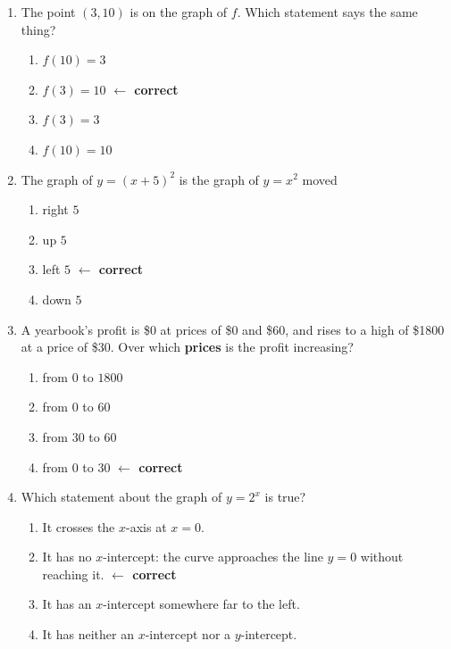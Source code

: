 \begin{enumerate}[leftmargin=1.8em, itemsep=6pt, topsep=5pt]
\small

\item The point $(3,10)$ is on the graph of $f$. Which statement says the same thing?
\begin{enumerate}[label=(\Alph*), leftmargin=2.2em, itemsep=1pt, topsep=2pt]
  \item $f(10)=3$
  \item $f(3)=10$ \quad \textcolor{keyred}{\textbf{$\leftarrow$ correct}}
  \item $f(3)=3$
  \item $f(10)=10$
\end{enumerate}

\item The graph of $y=(x+5)^2$ is the graph of $y=x^2$ moved
\begin{enumerate}[label=(\Alph*), leftmargin=2.2em, itemsep=1pt, topsep=2pt]
  \item right $5$
  \item up $5$
  \item left $5$ \quad \textcolor{keyred}{\textbf{$\leftarrow$ correct}}
  \item down $5$
\end{enumerate}

\item A yearbook's profit is \$0 at prices of \$0 and \$60, and rises to a high of \$1800 at a
price of \$30. Over which \textbf{prices} is the profit increasing?
\begin{enumerate}[label=(\Alph*), leftmargin=2.2em, itemsep=1pt, topsep=2pt]
  \item from $0$ to $1800$
  \item from $0$ to $60$
  \item from $30$ to $60$
  \item from $0$ to $30$ \quad \textcolor{keyred}{\textbf{$\leftarrow$ correct}}
\end{enumerate}

\item Which statement about the graph of $y=2^x$ is true?
\begin{enumerate}[label=(\Alph*), leftmargin=2.2em, itemsep=1pt, topsep=2pt]
  \item It crosses the $x$-axis at $x=0$.
  \item It has no $x$-intercept: the curve approaches the line $y=0$ without reaching it.
        \quad \textcolor{keyred}{\textbf{$\leftarrow$ correct}}
  \item It has an $x$-intercept somewhere far to the left.
  \item It has neither an $x$-intercept nor a $y$-intercept.
\end{enumerate}


\end{enumerate}
